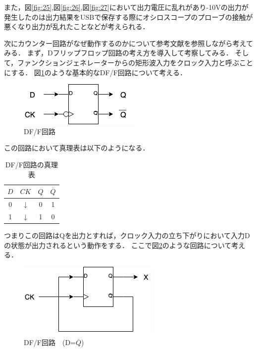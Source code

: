 \documentclass[11pt, a4paper,twocolumn]{jarticle}
\begin{document}
また，図\ref{fig:25},図\ref{fig:26},図\ref{fig:27}において出力電圧に乱れがあり-10Vの出力が発生したのは出力結果をUSBで保存する際にオシロスコープのプローブの接触が悪くなり出力が乱れたことなどが考えられる．

次にカウンター回路がなぜ動作するのかについて参考文献を参照しながら考えてみる．
まず，Dフリップフロップ回路の考え方を導入して考察してみる．
そして，ファンクションジェネレーターからの矩形波入力をクロック入力と呼ぶことにする．
図\ref{fig:28}のような基本的なDF/F回路について考える．

\newpage

\begin{figure}[htbp]
 \begin{center}
  \includegraphics[width=0.8\linewidth]{fig28.png}
 \end{center}
 \caption{DF/F回路}
 \label{fig:28}
\end{figure}

この回路において真理表は以下のようになる．

\begin{table}[htb]
  \begin{center}
    \caption{DF/F回路の真理表}
    \begin{tabular}{c c c c} \hline
         $D$ & $CK$ & $Q$ & $\overline{Q}$ \\ \hline \hline
         0 & ↓ & 0 & 1 \\ \hline
         1 & ↓ & 1 & 0 \\ \hline
    \end{tabular}
    \label{tab:3}
  \end{center}
\end{table}

つまりこの回路はQを出力とすれば，クロック入力の立ち下がりにおいて入力Dの状態が出力されるという動作をする．
ここで図\ref{fig:29}のような回路について考える．

\begin{figure}[htbp]
 \begin{center}
  \includegraphics[width=0.8\linewidth]{fig29.png}
 \end{center}
 \caption{DF/F回路　(D=$\overline{Q}$)}
 \label{fig:29}
\end{figure}
\end{document}
